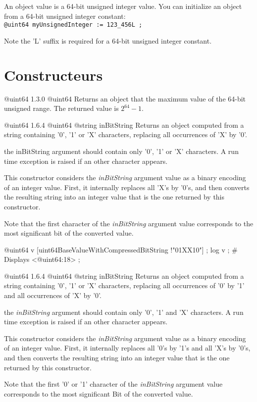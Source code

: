 

An  object value is a 64-bit unsigned integer value. You can initialize an  object from a 64-bit unsigned integer constant:\\

\texttt{@uint64 myUnsignedInteger := 123\_456L ;}\newline

Note the 'L' suffix is required for a 64-bit unsigned integer constant.

\section{Constructeurs}

{@uint64}
{1.3.0}
{@uint64}
{Returns an  object that the maximum value of the 64-bit unsigned range.}
{The returned value is $2^{64}-1$.}


{@uint64}
{1.6.4}
{@uint64}
{@string inBitString}
{Returns an  object computed from a string containing '0', '1' or 'X' characters, replacing all occurrences of 'X' by '0'.}
{the inBitString argument should contain only '0', '1' or 'X' characters. A run time exception is raised if an other character appears.

This constructor considers the \emph{inBitString} argument value as a binary encoding of an integer value. First, it internally replaces all 'X's by '0's, and then converts the resulting string into an integer value that is the one returned by this constructor.

Note that the first character of the \emph{inBitString} argument value corresponds to the most significant bit of the converted value.}


\exempleDeuxLignes
{}
{@uint64 v [uint64BaseValueWithCompressedBitString !"01XX10"] ;}
{log v ; \# Displays <@uint64:18> ;}





{@uint64}
{1.6.4}
{@uint64}
{@string inBitString}
{Returns an  object computed from a string containing '0', '1' or 'X' characters, replacing all occurrences of '0' by '1' and all occurrences of 'X' by '0'.}
{the \emph{inBitString} argument should contain only '0', '1' and 'X' characters. A run time exception is raised if an other character appears.

This constructor considers the \emph{inBitString} argument value as a binary encoding of an integer value. First, it internally replaces all '0's by '1's and all 'X's by '0's, and then converts the resulting string into an integer value that is the one returned by this constructor.

Note that the first '0' or '1' character of the \emph{inBitString} argument value corresponds to the most significant Bit of the converted value.}

